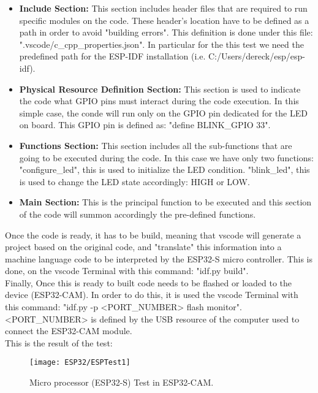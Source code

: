 \begin{itemize}
    \item\textbf{Include Section: }This section includes header files that are required to run specific modules on the code. These header's location have to be defined as a path in order to avoid "building errors". This definition is done under this file: ".vscode/c\_cpp\_properties.json". In particular for the this test we need the predefined path for the ESP-IDF installation (i.e. C:/Users/dereck/esp/esp-idf).
    \item\textbf{Physical Resource Definition Section: }This section is used to indicate the code what GPIO pins must interact during the code execution. In this simple case, the conde will run only on the GPIO pin dedicated for the LED on board. This GPIO pin is defined as: "define BLINK\_GPIO 33".
    \item\textbf{Functions Section: }This section includes all the sub-functions that are going to be executed during the code. In this case we have only two functions: "configure\_led", this is used to initialize the LED condition. "blink\_led", this is used to change the LED state accordingly: HIGH or LOW. 
    \item\textbf{Main Section: }This is the principal function to be executed and this section of the code will summon accordingly the pre-defined functions. 
\end{itemize}

Once the code is ready, it has to be build, meaning that \ac{vscode} will generate a project based on the original code, and "translate" this information into a machine language code to be interpreted by the ESP32-S micro controller. This is done, on the \ac{vscode} Terminal with this command: "idf.py build". \\

Finally, Once this is ready to built code needs to be flashed or loaded to the device (ESP32-CAM). In order to do this, it is used the  \ac{vscode} Terminal with this command: "idf.py -p <PORT\_NUMBER> flash monitor". <PORT\_NUMBER> is defined by the USB resource of the computer used to connect the ESP32-CAM module. \\

This is the result of the test: 

\begin{figure}  
    \begin{center}
        \texttt{[image: ESP32/ESPTest1]}
        \caption{Micro processor (ESP32-S) Test in ESP32-CAM.} 
        \label{fig:Micro processor (ESP32-S) Test in ESP32-CAM.}
    \end{center}
\end{figure}	

